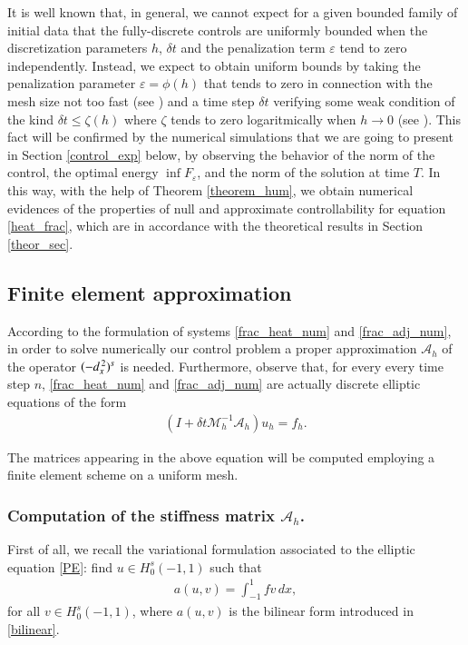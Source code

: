 It is well known that, in general, we cannot expect for a given bounded family of initial data that the fully-discrete controls are uniformly bounded when the discretization parameters $h$, $\delta t$ and the penalization term $\varepsilon$ tend to zero independently. Instead, we expect to obtain uniform bounds by taking the penalization parameter $\varepsilon=\phi(h)$ that tends to zero in connection with the mesh size not too fast (see \cite{boyer2013penalised}) and a time step $\delta t$ verifying some weak condition of the kind $\delta t\leq \zeta(h)$ where $\zeta$ tends to zero logaritmically when $h\to 0$ (see \cite{boyer2011uniform}). 
This fact will be confirmed by the numerical simulations that we are going to present in Section \ref{control_exp} below, by observing the behavior of the norm of the control, the optimal energy $\inf F_\varepsilon$, and the norm of the solution at time $T$. In this way, with the help of Theorem \ref{theorem_hum}, we obtain numerical evidences of the properties of null and approximate controllability for equation \eqref{heat_frac}, which are in accordance with the theoretical results in Section \ref{theor_sec}. 


\subsection{Finite element approximation}%
According to the formulation of systems \eqref{frac_heat_num} and \eqref{frac_adj_num}, in order to solve numerically our control problem a proper approximation $\mathcal A_h$ of the operator $(-d_x^{\,2})^{s}$ is needed. Furthermore, observe that, for every every time step $n$, \eqref{frac_heat_num} and \eqref{frac_adj_num} are actually discrete elliptic equations of the form
\begin{align*}
	\left(I+\delta t\mathcal M_h^{-1}\mathcal A_h\right)u_h = f_h.
\end{align*}   

The matrices appearing in the above equation will be computed employing a finite element scheme on a uniform mesh. 

\subsubsection*{Computation of the stiffness matrix $\mathcal A_h$.} First of all, we recall the variational formulation associated to the elliptic equation \eqref{PE}: find $u\in H_0^s(-1,1)$ such that
\begin{align}\label{WF}
	a(u,v) = \int_{-1}^1 fv\,dx,	
\end{align}
for all $v\in H_0^s(-1,1)$, where $a(u,v)$ is the bilinear form introduced in \eqref{bilinear}.

